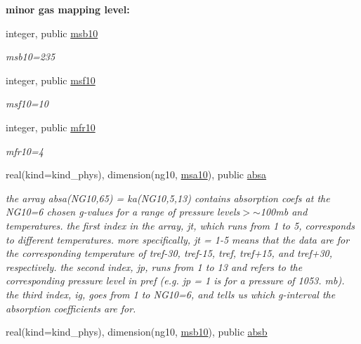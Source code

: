 \begin{Indent}\textbf{ minor gas mapping level\+:}\par
\begin{DoxyCompactItemize}
\item 
integer, public \hyperlink{group__module__radlw__kgbnn_gaf33570d793ca152588c14ce30ac30798}{msb10}
\begin{DoxyCompactList}\small\item\em msb10=235 \end{DoxyCompactList}\item 
integer, public \hyperlink{group__module__radlw__kgbnn_ga1b69c6fe99ed4ebc7b3d78b8f842b880}{msf10}
\begin{DoxyCompactList}\small\item\em msf10=10 \end{DoxyCompactList}\item 
integer, public \hyperlink{group__module__radlw__kgbnn_ga0f3944c4b86044e0c5db3dc351226c88}{mfr10}
\begin{DoxyCompactList}\small\item\em mfr10=4 \end{DoxyCompactList}\item 
real(kind=kind\+\_\+phys), dimension(ng10, \hyperlink{namespacemodule__radlw__kgb10_a2305b922082d1cc367276b636f09fb6c}{msa10}), public \hyperlink{group__module__radlw__kgbnn_ga14f18538f77c1a3d651e36acf90baa19}{absa}
\begin{DoxyCompactList}\small\item\em the array absa(\+N\+G10,65) = ka(\+N\+G10,5,13) contains absorption coefs at the N\+G10=6 chosen g-\/values for a range of pressure levels$>$$\sim$100mb and temperatures. the first index in the array, jt, which runs from 1 to 5, corresponds to different temperatures. more specifically, jt = 1-\/5 means that the data are for the corresponding temperature of tref-\/30, tref-\/15, tref, tref+15, and tref+30, respectively. the second index, jp, runs from 1 to 13 and refers to the corresponding pressure level in pref (e.\+g. jp = 1 is for a pressure of 1053. mb). the third index, ig, goes from 1 to N\+G10=6, and tells us which g-\/interval the absorption coefficients are for. \end{DoxyCompactList}\item 
real(kind=kind\+\_\+phys), dimension(ng10, \hyperlink{group__module__radlw__kgbnn_gaf33570d793ca152588c14ce30ac30798}{msb10}), public \hyperlink{group__module__radlw__kgbnn_gaf1e2252355a3002080be21ce37d45c3a}{absb}

\end{DoxyCompactItemize}
\end{Indent}
